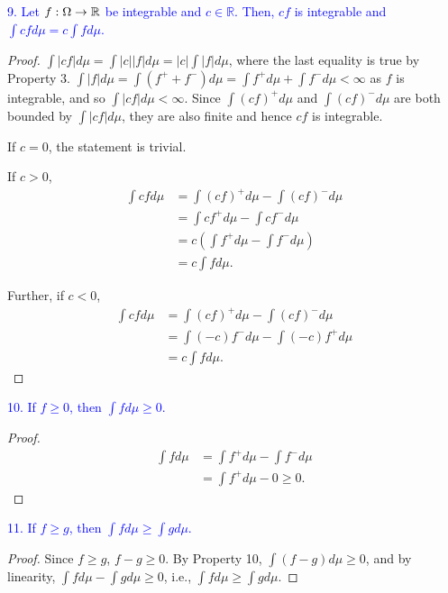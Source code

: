 \textcolor{blue}{9. Let $f: \Omega \to \mathbb{R}$ be integrable and $c \in \mathbb{R}$. Then, $cf$ is integrable and $\int cf d\mu = c\int fd\mu$.}
\begin{proof}
    $\int |cf| d\mu = \int |c||f| d\mu = |c| \int |f| d\mu $, where the last equality is true by Property 3. $\int |f| d\mu = \int (f^+ + f^-) d\mu = \int f^+ d\mu + \int f^- d\mu < \infty$ as $f$ is integrable, and so $\int |cf| d\mu < \infty$. Since $\int (cf)^+ d\mu$ and $\int (cf)^- d\mu$ are both bounded by $\int |cf| d\mu$, they are also finite and hence $cf$ is integrable.

    If $c = 0$, the statement is trivial. 

    If $c > 0$, 
    \begin{align*}
        \int cf d\mu &= \int(cf)^+  d\mu - \int (cf)^- d\mu \\
        &= \int cf^+ d\mu - \int cf^- d\mu \\
        &= c \left( \int f^+ d\mu - \int f^- d\mu \right) \\
        &= c \int f d\mu.
    \end{align*}

    Further, if $c < 0$, 
    \begin{align*}
        \int cf d\mu &= \int(cf)^+  d\mu - \int (cf)^- d\mu \\
        &= \int (-c) f^- d\mu - \int (-c)f^+ d\mu \\
        &= c \int f d\mu.
    \end{align*} 
\end{proof}

\textcolor{blue}{10. If $f \geq 0$, then $\int f d\mu \geq 0$.}
\begin{proof}
    \begin{align*}
        \int f d\mu &= \int f^+ d\mu - \int f^- d\mu \\
        &= \int f^+ d\mu - 0 \geq 0.
    \end{align*}
\end{proof}

\textcolor{blue}{11. If $f \geq g$, then $\int f d\mu \geq \int g d\mu$.}
\begin{proof}
    Since $f \geq g$, $f-g \geq 0$. By Property 10, $\int (f - g) d\mu \geq 0$, and by linearity, $\int f d\mu - \int gd\mu \geq 0$, i.e., $\int f d\mu \geq \int g d\mu$.
\end{proof}

